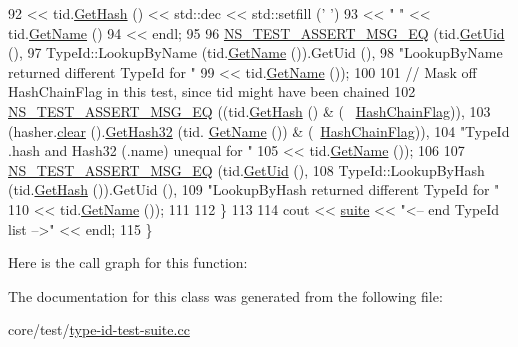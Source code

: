 \begin{DoxyCode}
92            << tid.\hyperlink{classns3_1_1TypeId_a0ef137a352a374aa1ecaaace20a091d2}{GetHash} () << std::dec << std::setfill (\textcolor{charliteral}{' '})
93            << \textcolor{stringliteral}{"    "}     << tid.\hyperlink{classns3_1_1TypeId_aa3c41c79ae428b3cb396a9c6bb3ef314}{GetName} ()
94            << endl;
95 
96       \hyperlink{group__testing_ga2a9d78cffb3db8e867c35fff0b698cf5}{NS\_TEST\_ASSERT\_MSG\_EQ} (tid.\hyperlink{classns3_1_1TypeId_acd3e41de6340d06299f4fd63e2ed8da0}{GetUid} (),
97                              TypeId::LookupByName (tid.\hyperlink{classns3_1_1TypeId_aa3c41c79ae428b3cb396a9c6bb3ef314}{GetName} ()).GetUid (),
98                              \textcolor{stringliteral}{"LookupByName returned different TypeId for "}
99                              << tid.\hyperlink{classns3_1_1TypeId_aa3c41c79ae428b3cb396a9c6bb3ef314}{GetName} ());
100 
101       \textcolor{comment}{// Mask off HashChainFlag in this test, since tid might have been chained}
102       \hyperlink{group__testing_ga2a9d78cffb3db8e867c35fff0b698cf5}{NS\_TEST\_ASSERT\_MSG\_EQ} ((tid.\hyperlink{classns3_1_1TypeId_a0ef137a352a374aa1ecaaace20a091d2}{GetHash} () & (~
      \hyperlink{classUniqueTypeIdTestCase_a66432bbd4685184c59237de907a1096ea81f1d39e319b1f8cce25024d66f099cd}{HashChainFlag})),
103                              (hasher.\hyperlink{classns3_1_1Hasher_a629108aa89019d84af8b2d85c7185f54}{clear} ().\hyperlink{classns3_1_1Hasher_ae3508556dba4c2f4fc4901a059623117}{GetHash32} (tid.
      \hyperlink{classns3_1_1TypeId_aa3c41c79ae428b3cb396a9c6bb3ef314}{GetName} ()) & (~\hyperlink{classUniqueTypeIdTestCase_a66432bbd4685184c59237de907a1096ea81f1d39e319b1f8cce25024d66f099cd}{HashChainFlag})),
104                              \textcolor{stringliteral}{"TypeId .hash and Hash32 (.name) unequal for "}
105                              << tid.\hyperlink{classns3_1_1TypeId_aa3c41c79ae428b3cb396a9c6bb3ef314}{GetName} ());
106 
107       \hyperlink{group__testing_ga2a9d78cffb3db8e867c35fff0b698cf5}{NS\_TEST\_ASSERT\_MSG\_EQ} (tid.\hyperlink{classns3_1_1TypeId_acd3e41de6340d06299f4fd63e2ed8da0}{GetUid} (),
108                              TypeId::LookupByHash (tid.\hyperlink{classns3_1_1TypeId_a0ef137a352a374aa1ecaaace20a091d2}{GetHash} ()).GetUid (),
109                              \textcolor{stringliteral}{"LookupByHash returned different TypeId for "}
110                              << tid.\hyperlink{classns3_1_1TypeId_aa3c41c79ae428b3cb396a9c6bb3ef314}{GetName} ());
111       
112     \}
113 
114   cout << \hyperlink{type-id-test-suite_8cc_ab4acb0fe33ca0947f675eed6196ed8ca}{suite} << \textcolor{stringliteral}{"<-- end TypeId list -->"} << endl;
115 \}
\end{DoxyCode}


Here is the call graph for this function\+:




The documentation for this class was generated from the following file\+:\begin{DoxyCompactItemize}
\item 
core/test/\hyperlink{type-id-test-suite_8cc}{type-\/id-\/test-\/suite.\+cc}\end{DoxyCompactItemize}
